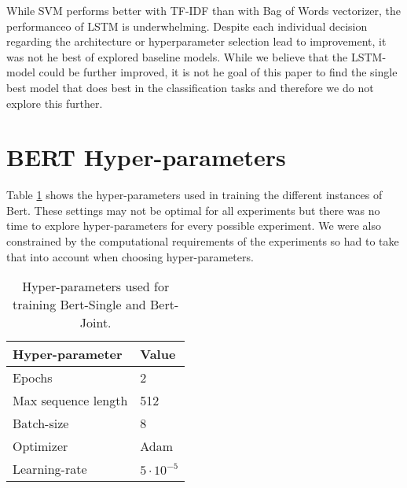 While SVM performs better with TF-IDF than with Bag of Words vectorizer, the performanceo of LSTM is underwhelming.
Despite each individual decision regarding the architecture or hyperparameter selection lead to improvement, it was not he best of explored baseline models.
While we believe that the LSTM-model could be further improved, it is not he goal of this paper to find the single best model that does best in the classification tasks and therefore we do not explore this further.

\section{BERT Hyper-parameters} \label{subsubsec:B_hparam}
Table \ref{tab:h_params} shows the hyper-parameters used in training the different instances of Bert.
These settings may not be optimal for all experiments but there was no time to explore hyper-parameters for every possible experiment. We were also constrained by the computational requirements of the experiments so had to take that into account when choosing hyper-parameters.
\begin{table}[ht]
    \centering
    \begin{tabular}{ll}
    \toprule
    \textbf{Hyper-parameter} & \textbf{Value}\\     %
    \midrule
    Epochs     & 2\\
    Max sequence length & 512\\
    Batch-size & 8\\
    Optimizer & Adam\\
    Learning-rate & $5\cdot10^{-5}$\\
    \bottomrule
    \end{tabular}
    \caption{Hyper-parameters used for training Bert-Single and Bert-Joint.}
    \label{tab:h_params}
\end{table}
